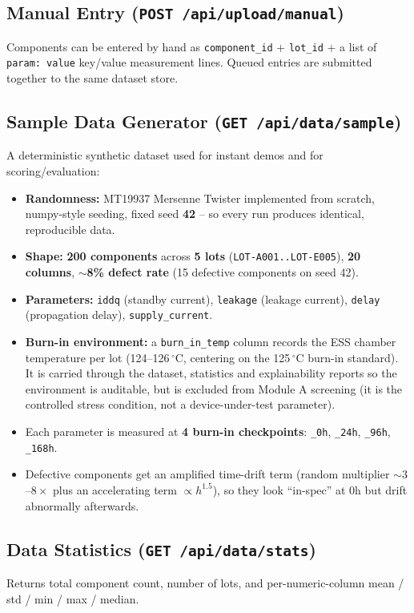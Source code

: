 \documentclass[11pt,a4paper]{article}
\newcommand{\code}[1]{\texttt{\small #1}}
\begin{document}
\subsection{Manual Entry (\code{POST /api/upload/manual})}
Components can be entered by hand as \code{component\_id} + \code{lot\_id} + a list of
\code{param: value} key/value measurement lines. Queued entries are submitted together to the
same dataset store.

\subsection{Sample Data Generator (\code{GET /api/data/sample})}
A deterministic synthetic dataset used for instant demos and for scoring/evaluation:
\begin{itemize}[leftmargin=1.5em]
  \item \textbf{Randomness:} MT19937 Mersenne Twister implemented from scratch, numpy-style
        seeding, fixed seed \textbf{42} -- so every run produces identical, reproducible data.
  \item \textbf{Shape:} \textbf{200 components} across \textbf{5 lots}
        (\code{LOT-A001..LOT-E005}), \textbf{20 columns}, \textbf{$\sim$8\% defect rate}
        (15 defective components on seed 42).
  \item \textbf{Parameters:} \code{iddq} (standby current), \code{leakage} (leakage current),
        \code{delay} (propagation delay), \code{supply\_current}.
  \item \textbf{Burn-in environment:} a \code{burn\_in\_temp} column records the ESS chamber
        temperature per lot (124--126\,$^{\circ}$C, centering on the 125\,$^{\circ}$C burn-in
        standard). It is carried through the dataset, statistics and explainability reports so
        the environment is auditable, but is excluded from Module A screening (it is the
        controlled stress condition, not a device-under-test parameter).
  \item Each parameter is measured at \textbf{4 burn-in checkpoints}:
        \code{\_0h}, \code{\_24h}, \code{\_96h}, \code{\_168h}.
  \item Defective components get an amplified time-drift term (random multiplier
        $\sim\!3$--$8\times$ plus an accelerating term $\propto h^{1.5}$), so they look
        ``in-spec'' at 0h but drift abnormally afterwards.
\end{itemize}

\subsection{Data Statistics (\code{GET /api/data/stats})}
Returns total component count, number of lots, and per-numeric-column mean / std / min / max /
median.
\end{document}
